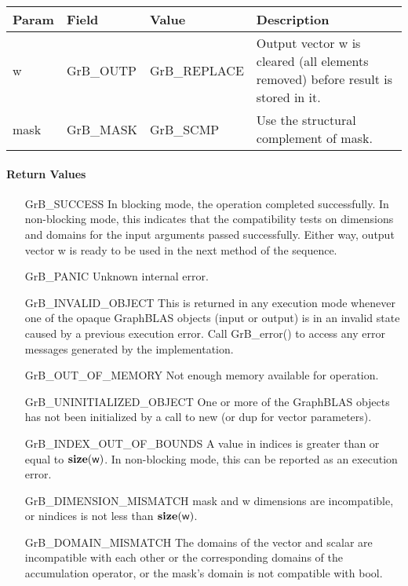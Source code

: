 \begin{itemize}[leftmargin=1.1in]
    \begin{tabular}{lllp{2.5in}}
    Param & Field  & Value & Description \\
    \hline
        {\sf w}    & {\sf GrB\_OUTP} & {\sf GrB\_REPLACE} & Output vector {\sf w} 
        is cleared (all elements removed) before result is stored in it.\\
        
        {\sf mask} & {\sf GrB\_MASK} & {\sf GrB\_SCMP}   & Use the structural 
        complement of {\sf mask}. \\
    \end{tabular}

\end{itemize}

\paragraph{Return Values}

\begin{itemize}[leftmargin=2.1in]
    \item[{\sf GrB\_SUCCESS}]         In blocking mode, the operation completed
    successfully. In non-blocking mode, this indicates that the compatibility 
    tests on dimensions and domains for the input arguments passed successfully. 
    Either way, output vector {\sf w} is ready to be used in the next method of 
    the sequence.

    \item[{\sf GrB\_PANIC}]            Unknown internal error.
    
    \item[{\sf GrB\_INVALID\_OBJECT}] This is returned in any execution mode 
    whenever one of the opaque GraphBLAS objects (input or output) is in an invalid 
    state caused by a previous execution error.  Call {GrB\_error()} to access 
    any error messages generated by the implementation.

    \item[{\sf GrB\_OUT\_OF\_MEMORY}]  Not enough memory available for operation.
    
    \item[{\sf GrB\_UNINITIALIZED\_OBJECT}] One or more of the GraphBLAS objects
    has not been initialized by a call to {\sf new} (or {\sf dup} for vector
    parameters).

    \item[{\sf GrB\_INDEX\_OUT\_OF\_BOUNDS}]  A value in {\sf indices} is greater
    than or equal to $\bold{size}({\sf w})$.  In non-blocking mode, this can be
    reported as an execution error.
    
    \item[{\sf GrB\_DIMENSION\_MISMATCH}] {\sf mask} and {\sf w} dimensions are
    incompatible, or {\sf nindices} is not less than $\bold{size}({\sf w})$. 

    \item[{\sf GrB\_DOMAIN\_MISMATCH}]    The domains of the vector and scalar are
	incompatible with each other or the corresponding domains of the 
    accumulation operator, or the mask's domain is not compatible with bool.
\end{itemize}


